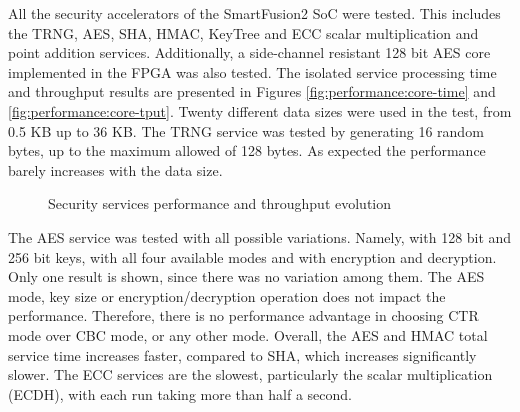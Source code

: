 All the security accelerators of the SmartFusion2 SoC were tested. This includes the TRNG, AES, SHA, HMAC, KeyTree and ECC scalar multiplication and point addition services.
Additionally, a side-channel resistant 128 bit AES core implemented in the FPGA was also tested.
The isolated service processing time and throughput results are presented in Figures \ref{fig:performance:core-time} and \ref{fig:performance:core-tput}. Twenty different data sizes were used in the test, from 0.5 KB up to 36 KB.
The TRNG service was tested by generating 16 random bytes, up to the maximum allowed of 128 bytes. As expected the performance barely increases with the data size.
\begin{figure}[h!]
	\centering     %
	\caption{Security services performance and throughput evolution}
\end{figure}
The AES service was tested with all possible variations. Namely, with 128 bit and 256 bit keys, with all four available modes and with encryption and decryption. Only one result is shown, since there was no variation among them. The AES mode, key size or encryption/decryption operation does not impact the performance. Therefore, there is no performance advantage in choosing CTR mode over CBC mode, or any other mode.
Overall, the AES and HMAC total service time increases faster, compared to SHA, which increases significantly slower.
The ECC services are the slowest, particularly the scalar multiplication (ECDH), with each run taking more than half a second.

